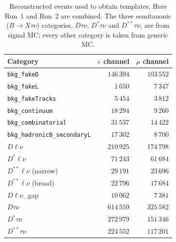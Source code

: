 \begin{table}[htbp]
  \centering
  \caption{Reconstructed events used to obtain templates. Here Run~1
  and Run~2 are combined. The three semitauonic ($B\to X\tau\nu$) categories,
  $D\tau\nu$, $D^{*}\tau\nu$ and $D^{**}\tau\nu$, are from signal MC;
  every other category is taken from generic MC.}
\vspace{1.0mm}
  
  \label{tab:sensitivity-sample-sizes}
  \small
  \begin{tabular}{l r r}
    \hline
    Category & $e$ channel & $\mu$ channel \\
    \hline
    \texttt{bkg\_fakeD}                    & $146\,394$ & $103\,552$ \\
    \texttt{bkg\_fakeL}                    & $1\,650$   & $7\,347$   \\
    \texttt{bkg\_fakeTracks}               & $5\,454$   & $3\,812$   \\
    \texttt{bkg\_continuum}                & $18\,294$  & $9\,260$   \\
    \texttt{bkg\_combinatorial}            & $31\,537$  & $14\,422$  \\
    \texttt{bkg\_hadronicB\_secondaryL}    & $17\,302$  & $8\,700$   \\
    $D\ell\nu$                             & $210\,925$ & $174\,798$ \\
    $D^{*}\ell\nu$                         & $71\,243$  & $61\,684$  \\
    $D^{**}\ell\nu$ (narrow)                & $29\,191$  & $23\,696$  \\
    $D^{**}\ell\nu$ (broad)                 & $22\,796$  & $17\,684$  \\
    $D\ell\nu$\_gap                        & $10\,062$  & $7\,381$   \\
    $D\tau\nu$                             & $614\,559$ & $325\,582$ \\
    $D^{*}\tau\nu$                         & $272\,979$ & $151\,346$ \\
    $D^{**}\tau\nu$                        & $224\,552$ & $117\,201$ \\
    \hline
  \end{tabular}
\end{table}


